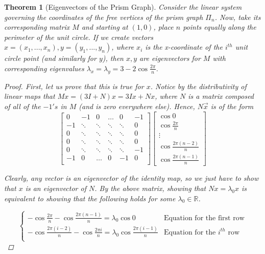 \documentclass[11pt]{report}
\newtheorem{theorem}{Theorem}[section]
\begin{document}
\begin{theorem}[Eigenvectors of the Prism Graph]
    Consider the linear system governing the coordinates of the free vertices of the prism graph $\Pi_n$. Now, take its corresponding matrix $M$ and starting at $(1, 0)$, place $n$ points equally along the perimeter of the unit circle. If we create vectors $x = (x_1, ..., x_n), y = (y_1, ..., y_n)$, where $x_i$ is the x-coordinate of the $i^{th}$ unit circle point (and similarly for $y$), then $x, y$ are eigenvectors for $M$ with corresponding eigenvalues
    $\lambda_x = \lambda_y = 3 - 2 \cos{\frac{2\pi}{n}}$.
    
    \begin{proof}
        First, let us prove that this is true for $x$. Notice by the distributivity of linear maps that $Mx = (3I + N)x = 3Ix + Nx$, where $N$ is a matrix composed of all of the $-1's$ in $M$ (and is zero everywhere else). Hence, $N\vec{x}$ is of the form
        \[
        \begin{bmatrix}
        0  & -1     & 0      & \dots   & 0      & -1 \\
        -1 & \ddots & \ddots & \ddots  & \ddots & 0 \\
        0  & \ddots & \ddots & \ddots  & \ddots & 0 \\
        0  & \ddots & \ddots & \ddots  & \ddots & 0 \\
        0  & \ddots & \ddots & \ddots  & \ddots & -1 \\
        -1 & 0      & \dots  & 0       & -1     & 0 \\
        \end{bmatrix}
        \begin{bmatrix}
            \cos{0} \\ 
            \cos{\frac{2 \pi}{n}} \\
            \vdots \\
            \cos{\frac{2 \pi(n-2)}{n}} \\
            \cos{\frac{2 \pi(n-1)}{n}}
        \end{bmatrix}
        \]
        
        Clearly, any vector is an eigenvector of the identity map, so we just have to show that $x$ is an eigenvector of $N$. By the above matrix, showing that $Nx = \lambda_0 x$ is equivalent to showing that the following holds for some $\lambda_0 \in \mathbb{R}$.
        
        \[\begin{cases}
        -\cos{\frac{2 \pi}{n}} - \cos{\frac{2\pi(n-1)}{n}} = \lambda_0 \cos{0} &\text{Equation for the first row} \\
        -\cos{\frac{2 \pi (i - 2)}{n}} - \cos{\frac{2 \pi i}{n}} = \lambda_0 \cos{\frac{2\pi(i-1)}{n}}
        &\text{Equation for the $i^{th}$ row} \\
        \end{cases}\]
        

\end{proof}
\end{theorem}
\end{document}
